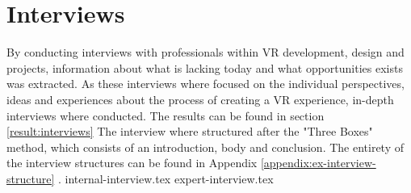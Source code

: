 \section{Interviews}
By conducting interviews with professionals within VR development, design and projects, information about what is lacking today and what opportunities exists was extracted. As these interviews where focused on the individual perspectives, ideas and experiences about the process of creating a VR experience, in-depth interviews where conducted\cite{interview:Boyce2006}. The results can be found in section \ref{result:interviews}
The interview where structured after the "Three Boxes" method, which consists of an introduction, body and conclusion\cite{interview:Hall2013}. The entirety of the interview structures can be found in Appendix \ref{appendix:ex-interview-structure} .
{internal-interview.tex}
{expert-interview.tex}
